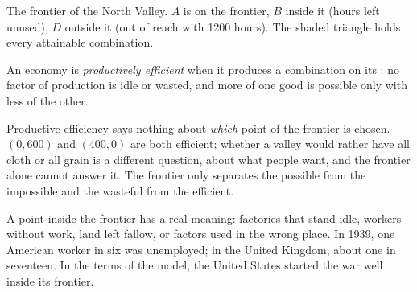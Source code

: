\begin{omfigure}

{\small The frontier of the North Valley. $A$ is on the frontier, $B$ inside it (hours left unused),
$D$ outside it (out of reach with \num{1200} hours). The shaded triangle holds every attainable
combination.}
\end{omfigure}

\begin{definition}\label{def:g10:production-possibility-frontier:productive-efficiency}
An economy is \emph{productively efficient} when it produces a
combination on its : no factor of production is idle or wasted, and
more of one good is possible only with less of the other.
\end{definition}

Productive efficiency says nothing about \emph{which} point of the frontier is chosen. $(0, 600)$ and
$(400, 0)$ are both efficient; whether a valley would rather have all cloth or all grain is a
different question, about what people want, and the frontier alone cannot answer it. The frontier
only separates the possible from the impossible and the wasteful from the efficient.

A point inside the frontier has a real meaning: factories that stand idle, workers without work, land
left fallow, or factors used in the wrong place. In 1939, one American worker in six was unemployed;
in the United Kingdom, about one in seventeen. In the terms of the model, the United States started
the war well inside its frontier.

